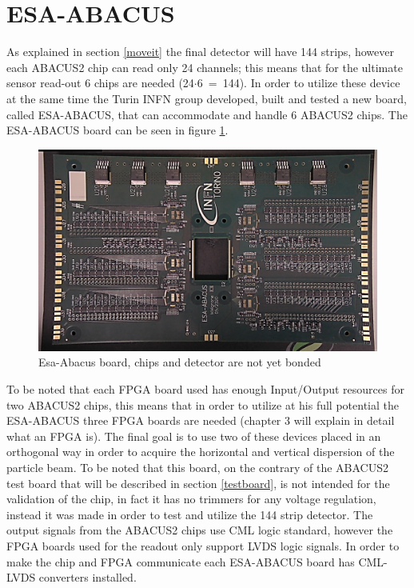 \section{ESA-ABACUS}\label{esaabacus}
\noindent As explained in section \ref{moveit} the final detector will have 144 strips, however each ABACUS2 chip can read only 24 channels; this means that for the ultimate sensor read-out 6 chips are needed (24$\cdot$6~=~144).
In order to utilize these device at the same time the Turin INFN group developed, built and tested a new board, called ESA-ABACUS, that can accommodate and handle 6 ABACUS2 chips. The ESA-ABACUS board can be seen in figure \ref{fig:esaabacus}.
\begin{figure}[H]
	\centering
	\includegraphics[width=0.7\linewidth]{IMG/ch2/EsaAbacus.png}
	\caption{Esa-Abacus board, chips and detector are not yet bonded}
	\label{fig:esaabacus}
\end{figure}
\noindent To be noted that each FPGA board used has enough Input/Output resources for two ABACUS2 chips, this means that in order to utilize at his full potential the ESA-ABACUS three FPGA boards are needed (chapter 3 will explain in detail what an FPGA is).
The final goal is to use two of these devices placed in an orthogonal way in order to acquire the horizontal and vertical dispersion of the particle beam.
To be noted that this board, on the contrary of the ABACUS2 test board that will be described in section \ref{testboard}, is not intended for the validation of the chip, in fact it has no trimmers for any voltage regulation, instead it was made in order to test and utilize the 144 strip detector.
The output signals from the ABACUS2 chips use CML logic standard, however the FPGA boards used for the readout only support LVDS logic signals. In order to make the chip and FPGA communicate each ESA-ABACUS board has CML-LVDS converters installed.


